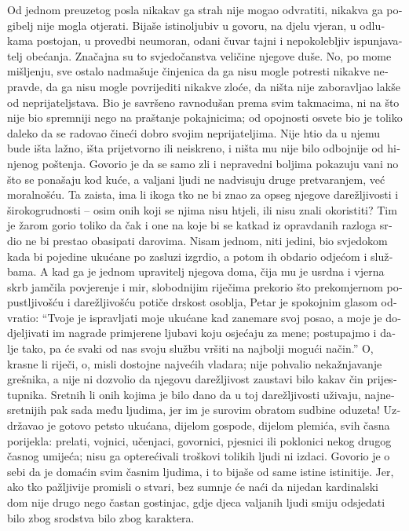 \documentclass[a5paper,twoside]{article}
\begin{document}
\begin{pages}
\begin{Rightside}
\begin{croatian}
\pstart
Od jednom preuzetog posla nikakav ga strah nije mogao odvratiti, nikakva ga pogibelj nije mogla otjerati.  Bijaše istinoljubiv u govoru, na djelu vjeran, u odlukama postojan, u provedbi neumoran, odani čuvar tajni i nepokolebljiv ispunjavatelj obećanja. Značajna su to svjedočanstva veličine njegove duše.  No, po mome mišljenju, sve ostalo nadmašuje činjenica da ga nisu mogle potresti nikakve nepravde, da ga nisu mogle povrijediti nikakve zloće, da ništa nije zaboravljao lakše od neprijateljstava.  Bio je savršeno ravnodušan prema svim takmacima, ni na što nije bio spremniji nego na praštanje pokajnicima; od opojnosti osvete bio je toliko daleko da se radovao čineći dobro svojim neprijateljima.  Nije htio da u njemu bude išta lažno, išta prijetvorno ili neiskreno, i ništa mu nije bilo odbojnije od hinjenog poštenja.  Govorio je da se samo zli i nepravedni boljima pokazuju vani no što se ponašaju kod kuće, a valjani ljudi ne nadvisuju druge pretvaranjem, već moralnošću.  Ta zaista, ima li ikoga tko ne bi znao za opseg njegove darežljivosti i širokogrudnosti – osim onih koji se njima nisu htjeli, ili nisu znali okoristiti?  Tim je žarom gorio toliko da čak i one na koje bi se katkad iz opravdanih razloga srdio ne bi prestao obasipati darovima.  Nisam jednom, niti jedini, bio svjedokom kada bi pojedine ukućane po zasluzi izgrdio, a potom ih obdario odjećom i službama. A kad ga je jednom upravitelj njegova doma, čija mu je usrdna i vjerna skrb jamčila povjerenje i mir, %
slobodnijim riječima prekorio što prekomjernom popustljivošću i darežljivošću potiče drskost osoblja, Petar je spokojnim glasom odvratio: ``Tvoje je ispravljati moje ukućane kad zanemare svoj posao, a moje je dodjeljivati im nagrade primjerene ljubavi koju osjećaju za mene; postupajmo i dalje tako, pa će svaki od nas svoju službu vršiti na najbolji mogući način.''  O, krasne li riječi, o, misli dostojne najvećih vladara; nije pohvalio nekažnjavanje grešnika, a nije ni dozvolio da njegovu darežljivost zaustavi bilo kakav čin prijestupnika.  Sretnih li onih kojima je bilo dano da u toj darežljivosti uživaju, najnesretnijih pak sada među ljudima, jer im je surovim obratom sudbine oduzeta!  Uzdržavao je gotovo petsto ukućana, dijelom gospode, dijelom plemića, svih časna porijekla: prelati, vojnici, učenjaci, govornici, pjesnici ili poklonici nekog drugog časnog umijeća; nisu ga opterećivali troškovi tolikih ljudi ni izdaci. Govorio je o sebi da je domaćin svim časnim ljudima, i to bijaše od same istine istinitije.  Jer, ako tko pažljivije promisli o stvari, bez sumnje će naći da nijedan kardinalski dom nije drugo nego častan gostinjac, gdje djeca valjanih ljudi smiju odsjedati bilo zbog srodstva bilo zbog karaktera.


\end{croatian}
\end{Rightside}
\end{pages}
\end{document}

